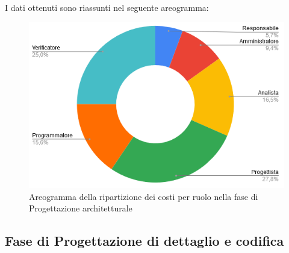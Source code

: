 I dati ottenuti sono riassunti nel seguente areogramma:
\begin{figure}[H]
\centering
\includegraphics[scale=0.60]{img/grafici/torta_fase_prog_architetturale.png}
\caption{Areogramma della ripartizione dei costi per ruolo nella fase di Progettazione architetturale}
\end{figure}
 
 
\subsection{Fase di Progettazione di dettaglio e codifica}
